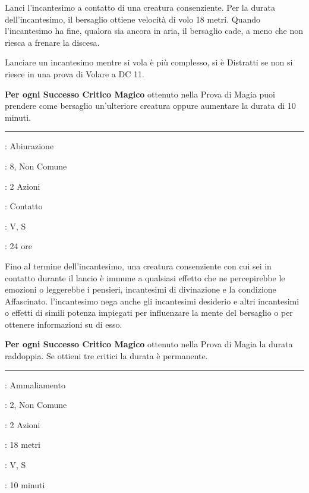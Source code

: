 \begin{multicols}{2}
Lanci l'incantesimo a contatto di una creatura consenziente. Per la durata dell'incantesimo, il bersaglio ottiene velocità di volo 18 metri. Quando l'incantesimo ha fine, qualora sia ancora in aria, il bersaglio cade, a meno che non riesca a frenare la discesa.

Lanciare un incantesimo mentre si vola è più complesso, si è Distratti se non si riesce in una prova di Volare a DC 11.

\textbf{Per ogni Successo Critico Magico} ottenuto nella Prova di Magia puoi prendere come bersaglio un'ulteriore creatura oppure aumentare la durata di 10 minuti.

\smallskip\noindent\rule{\linewidth}{2pt} \hypertarget{Scudo Mentale}{}\smallskip{}
\noindent
\begin{description}[noitemsep, topsep=0pt, parsep=0pt, partopsep=0pt, leftmargin=0cm, labelwidth=2.8cm]
	\item[\textbf{Lista di Magia}]: Abiurazione
	\item[\textbf{Livello}]: 8, Non Comune
	\item[\textbf{T. di Lancio}]: 2 Azioni
	\item[\textbf{Gittata}]: Contatto
	\item[\textbf{Componenti}]: V, S
	\item[\textbf{Durata}]: 24 ore
\end{description}

Fino al termine dell'incantesimo, una creatura consenziente con cui sei in contatto durante il lancio è immune a qualsiasi effetto che ne percepirebbe le emozioni o leggerebbe i pensieri, incantesimi di divinazione e la condizione Affascinato. l'incantesimo nega anche gli incantesimi desiderio e altri incantesimi o effetti di simili potenza impiegati per
influenzare la mente del bersaglio o per ottenere informazioni su di esso.

\textbf{Per ogni Successo Critico Magico} ottenuto nella Prova di Magia la durata raddoppia. Se ottieni tre critici la durata è permanente.

\smallskip\noindent\rule{\linewidth}{2pt} \hypertarget{Zona di Verità}{}\smallskip{}
\noindent
\begin{description}[noitemsep, topsep=0pt, parsep=0pt, partopsep=0pt, leftmargin=0cm, labelwidth=2.8cm]
	\item[\textbf{Lista di Magia}]: Ammaliamento
	\item[\textbf{Livello}]: 2, Non Comune
	\item[\textbf{T. di Lancio}]: 2 Azioni
	\item[\textbf{Gittata}]: 18 metri
	\item[\textbf{Componenti}]: V, S
	\item[\textbf{Durata}]: 10 minuti
\end{description}


\end{multicols}

